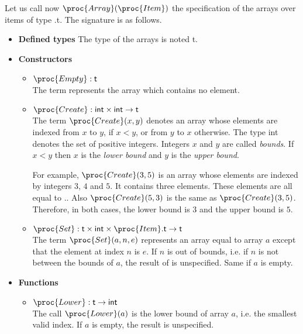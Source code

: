 \documentclass[11pt,a4paper]{article}
\newcommand\type[1]{\textsf{#1}}
\begin{document}
\noindent Let us call now \(\proc{Array}(\proc{Item})\) the
specification of the arrays over items of type
.\type{t}. The signature is as follows.
\begin{itemize}

  \item \textbf{Defined types}
  The type of the arrays is noted \type{t}.

  \item \textbf{Constructors}
  \begin{itemize}

    \item \(\proc{Empty} : \type{t}\)\\
    The term  represents the array which contains no
    element.

    \item \(\proc{Create} : \type{int} \times \type{int} \rightarrow
    \type{t}\)\\ 
    The term \(\proc{Create} (x, y)\) denotes an array whose
    elements are indexed from \(x\) to \(y\), if \(x < y\),
    or from \(y\) to \(x\) otherwise. The type \type{int} denotes
    the set of positive integers. Integers \(x\) and \(y\) are
    called \emph{bounds}. If \(x < y\) then \(x\) is the
    \emph{lower bound} and \(y\) is the \emph{upper bound}.

    For example, \(\proc{Create}(3, 5)\) is an array whose elements
    are indexed by integers \(3\), \(4\) and \(5\). It contains three
    elements. These elements are all equal to
    .. Also \(\proc{Create} (5, 3)\) is the
    same as \(\proc{Create} (3, 5)\).  Therefore, in both cases, the
    lower bound is \(3\) and the upper bound is \(5\).

    \item \(\proc{Set} : \type{t} \times \type{int} \times
    \proc{Item}.\type{t} \rightarrow \type{t}\)\\
    The term \(\proc{Set} (a, n, e)\) represents an
    array equal to array \(a\) except that the element at index
    \(n\) is \(e\). If \(n\) is out of bounds, i.e. if \(n\) is
    not between the bounds of \(a\), the result of  is
    unspecified. Same if \(a\) is empty.

  \end{itemize}

  \item \textbf{Functions}
  \begin{itemize}
  
    \item \(\proc{Lower} : \type{t} \rightarrow \type{int}\)\\
    The call \(\proc{Lower} (a)\) is the lower bound of array
    \(a\), i.e. the smallest valid index. If \(a\) is empty, the
    result is unspecified.


\end{itemize}
\end{itemize}
\end{document}
